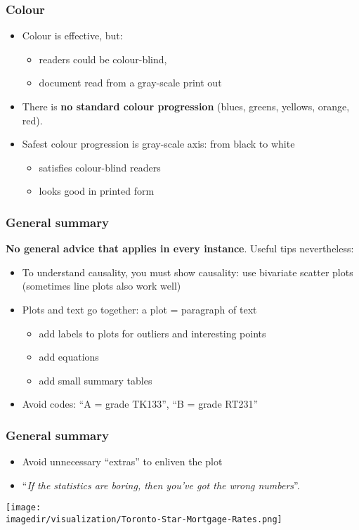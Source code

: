 \begin{frame}[allowframebreaks]\frametitle{Colour}
	\begin{itemize}
		\item	Colour is effective, but: 
		\begin{itemize}
			\item	readers could be colour-blind, 
			\item	document read from a gray-scale print out 
		\end{itemize}
	\end{itemize}
	\begin{itemize}
		\item	There is \textbf{no standard colour progression} (blues, greens, yellows, orange, red). 
		\item	Safest colour progression is gray-scale axis: from black to white 
		\begin{itemize}
			\item	satisfies colour-blind readers 
			\item	looks good in printed form 
		\end{itemize}
	\end{itemize}
\end{frame}

\begin{frame}\frametitle{General summary}
	
	\textbf{No general advice that applies in every instance}. Useful tips nevertheless:
	\begin{itemize}
		\item	To understand causality, you must show causality: use bivariate scatter plots (sometimes line plots also work well) 
		\item	Plots and text go together: a plot = paragraph of text 
		\begin{itemize}
			\item	add labels to plots for outliers and interesting points 
			\item	add equations 
			\item	add small summary tables 
		\end{itemize}
		\item	Avoid codes: ``A = grade TK133'', ``B = grade RT231'' 
	\end{itemize}
\end{frame}

\begin{frame}\frametitle{General summary}
	\begin{itemize}
		\item	Avoid unnecessary ``extras'' to enliven the plot 
		\item	``\emph{If the statistics are boring, then you've got the wrong numbers}''. 
	\end{itemize}
	\begin{center}
		\texttt{[image: \\imagedir/visualization/Toronto-Star-Mortgage-Rates.png]}
	\end{center}
\end{frame}


